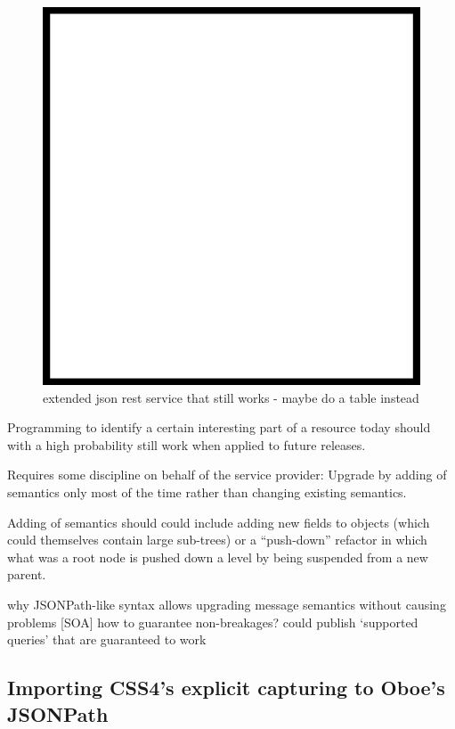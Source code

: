\documentclass[]{article}
\makeatletter
\def\maxwidth{\ifdim\Gin@nat@width>\linewidth\linewidth
\else\Gin@nat@width\fi}
\let\Oldincludegraphics\includegraphics
\renewcommand{\includegraphics}[1]{\Oldincludegraphics[width=\maxwidth]{#1}}
\makeatother
\begin{document}
\begin{figure}[htbp]
\centering
\includegraphics{images/placeholder.png}
\caption{extended json rest service that still works - maybe do a table
instead \label{enhancingrest}}
\end{figure}

Programming to identify a certain interesting part of a resource today
should with a high probability still work when applied to future
releases.

Requires some discipline on behalf of the service provider: Upgrade by
adding of semantics only most of the time rather than changing existing
semantics.

Adding of semantics should could include adding new fields to objects
(which could themselves contain large sub-trees) or a ``push-down''
refactor in which what was a root node is pushed down a level by being
suspended from a new parent.

why JSONPath-like syntax allows upgrading message semantics without
causing problems {[}SOA{]} how to guarantee non-breakages? could publish
`supported queries' that are guaranteed to work

\subsection{Importing CSS4's explicit capturing to Oboe's JSONPath}
\end{document}
